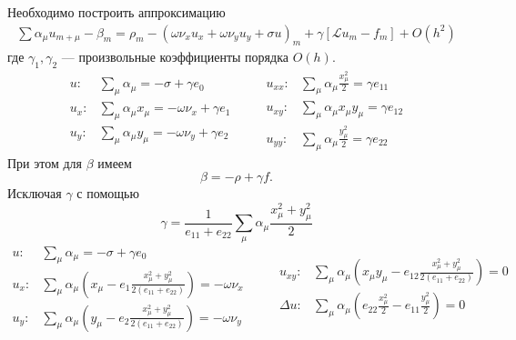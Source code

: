 \documentclass[12pt]{article}
\begin{document}
Необходимо построить аппроксимацию
\begin{multline*}
	\sum \alpha_\mu u_{m+\mu} - \beta_m = \rho_m - (\omega\nu_x u_x + \omega\nu_y u_y + \sigma u)_m 
	+ \gamma \left[\mathcal{L} u_m - f_m\right]
	+ O(h^2)
\end{multline*}
где $\gamma_1, \gamma_2$ --- произвольные коэффициенты порядка $O(h)$.
\[
\begin{aligned}
u: &\sum_\mu \alpha_\mu = -\sigma + \gamma e_0 \\
u_x: &\sum_\mu \alpha_\mu x_\mu = -\omega\nu_x + \gamma e_1\\
u_y: &\sum_\mu \alpha_\mu y_\mu = -\omega\nu_y + \gamma e_2
\end{aligned}
\qquad
\begin{aligned}
u_{xx}: &\sum_\mu \alpha_\mu \frac{x_\mu^2}{2} = \gamma e_{11}\\
u_{xy}: &\sum_\mu \alpha_\mu x_\mu y_\mu = \gamma e_{12}\\
u_{yy}: &\sum_\mu \alpha_\mu \frac{y_\mu^2}{2} = \gamma e_{22}
\end{aligned}
\]
При этом для $\beta$ имеем
\[
\beta = -\rho + \gamma f.
\]
Исключая $\gamma$ с помощью
\[
\gamma = \frac{1}{e_{11} + e_{22}} \sum_\mu \alpha_\mu\frac{x_\mu^2 + y_\mu^2}{2}
\]
\[
\begin{aligned}
u: &\sum_\mu \alpha_\mu = -\sigma + \gamma e_0 \\
u_x: &\sum_\mu \alpha_\mu \left(x_\mu - e_1\frac{x_\mu^2 + y_\mu^2}{2(e_{11} + e_{22})}\right) = -\omega\nu_x\\
u_y: &\sum_\mu \alpha_\mu \left(y_\mu - e_2\frac{x_\mu^2 + y_\mu^2}{2(e_{11} + e_{22})}\right) = -\omega\nu_y
\end{aligned}
\qquad
\begin{aligned}
u_{xy}: &\sum_\mu \alpha_\mu \left(
x_\mu y_\mu - e_{12}\frac{x_\mu^2 + y_\mu^2}{2(e_{11} + e_{22})}
\right)
 = 0\\
\Delta u: &\sum_\mu \alpha_\mu \left(e_{22} \frac{x_\mu^2}{2} - e_{11} \frac{y_\mu^2}{2}\right) = 0
\end{aligned}
\]
\end{document}
